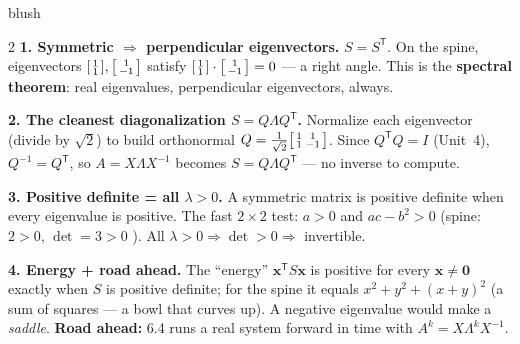 \documentclass[10pt]{article}
\newcommand{\xx}{\mathbf{x}}
\newcommand{\zero}{\mathbf{0}}
\newcommand{\T}{\mathsf{T}}
\begin{document}
\begin{skillbox}[Lesson]{blush}
\begin{multicols}{2}
\textbf{1. Symmetric $\Rightarrow$ perpendicular eigenvectors.} $S=S^{\T}$. On the spine, eigenvectors
$\begin{bsmallmatrix}1\\1\end{bsmallmatrix},\begin{bsmallmatrix}1\\-1\end{bsmallmatrix}$ satisfy
$\begin{bsmallmatrix}1\\1\end{bsmallmatrix}\cdot\begin{bsmallmatrix}1\\-1\end{bsmallmatrix}=0$ --- a right
angle. This is the \textbf{spectral theorem}: real eigenvalues, perpendicular eigenvectors, always.

\textbf{2. The cleanest diagonalization $S=Q\Lambda Q^{\T}$.} Normalize each eigenvector (divide by $\sqrt2$)
to build orthonormal $Q=\frac{1}{\sqrt2}\begin{bsmallmatrix}1&1\\1&-1\end{bsmallmatrix}$. Since $Q^{\T}Q=I$
(Unit~4), $Q^{-1}=Q^{\T}$, so $A=X\Lambda X^{-1}$ becomes $S=Q\Lambda Q^{\T}$ --- no inverse to compute.

\columnbreak

\textbf{3. Positive definite = all $\lambda>0$.} A symmetric matrix is positive definite when every
eigenvalue is positive. The fast $2\times2$ test: $a>0$ and $ac-b^2>0$ (spine: $2>0$, $\det=3>0$
\checkmark). All $\lambda>0\Rightarrow\det>0\Rightarrow$ invertible.

\textbf{4. Energy + road ahead.} The ``energy'' $\xx^{\T}S\xx$ is positive for every $\xx\ne\zero$ exactly
when $S$ is positive definite; for the spine it equals $x^2+y^2+(x+y)^2$ (a sum of squares --- a bowl that
curves up). A negative eigenvalue would make a \emph{saddle}. \textbf{Road ahead:} 6.4 runs a real system
forward in time with $A^k=X\Lambda^k X^{-1}$.
\end{multicols}
\end{skillbox}
\end{document}

